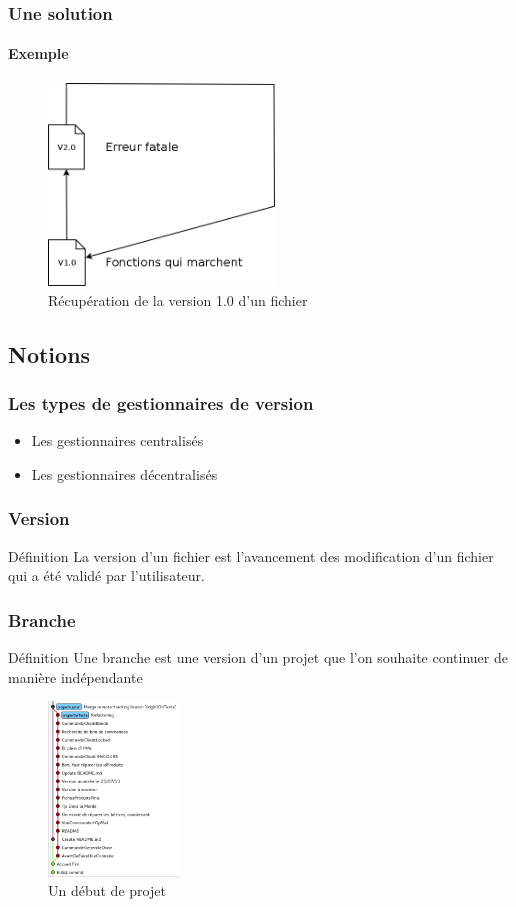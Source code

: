 \begin{frame}
 \frametitle{Une solution}
 \framesubtitle{Exemple}
\begin{figure}
 \centering
 \includegraphics[width=60mm]{./Img/RevertFich.png}
 \caption{Récupération de la  version 1.0 d'un fichier}
\end{figure}
\end{frame}



\subsection{Notions}
\begin{frame}
\frametitle{Les types de gestionnaires de version}
\begin{itemize}
 \item<1,2> Les gestionnaires centralisés 
 \item<3-> Les gestionnaires décentralisés 
\end{itemize}
\end{frame}


\begin{frame}
\frametitle{Version}
\begin{block}{Définition}
La version d'un fichier est l'avancement des modification d'un fichier qui a été validé par l'utilisateur.
\end{block}

\end{frame}

\begin{frame}
\frametitle{Branche}
\begin{block}{Définition}
Une branche est une version d'un projet que l'on souhaite continuer de manière indépendante 
\end{block}
\begin{figure}
 \centering
 \includegraphics[width=35mm]{./Img/DefBranches.png}
 \caption{Un début de projet}
\end{figure}

\end{frame}